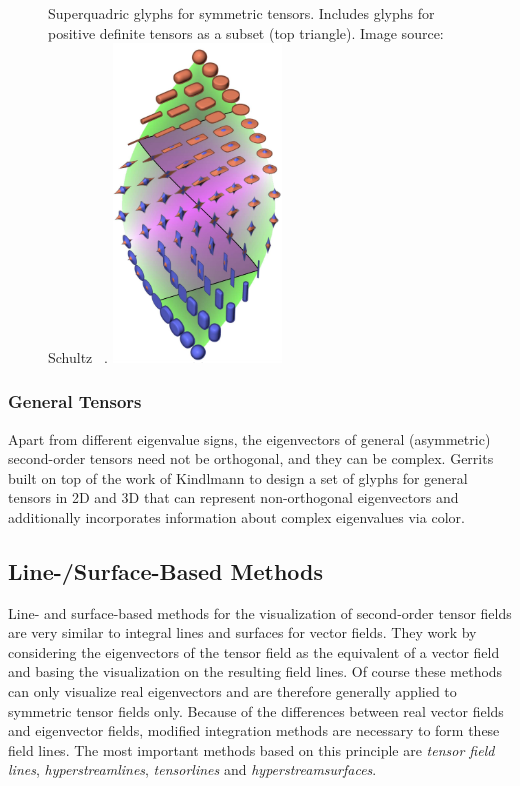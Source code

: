 \begin{figure}
    \begin{captionbeside}
        {Superquadric glyphs for symmetric tensors. Includes glyphs for positive
         definite tensors as a subset (top triangle). Image source: Schultz
         \etal~\cite{Schultz2010a}.\label{fig:tensor_glyphs}}
        \includegraphics[width=0.4\textwidth]{figures/symmetric_tensor_glyphs.png}
    \end{captionbeside}
\end{figure}

\subsubsection{General Tensors} %
%
Apart from different eigenvalue signs, the eigenvectors of general (asymmetric)
second-order tensors need not be orthogonal, and they can be complex.
%
Gerrits \etal~\cite{Gerrits2017} built on top of the work of Kindlmann \etal to
design a set of glyphs for general tensors in \ac{2D} and \ac{3D} that can
represent non-orthogonal eigenvectors and additionally incorporates information
about complex eigenvalues via color.
%

\subsection{Line-/Surface-Based Methods} %
\label{sub:tensor_line_surface_based}
%
Line- and surface-based methods for the visualization of second-order tensor
fields are very similar to integral lines and surfaces for vector fields.
%
They work by considering the eigenvectors of the tensor field as the equivalent
of a vector field and basing the visualization on the resulting field lines.
%
Of course these methods can only visualize real eigenvectors and are therefore
generally applied to symmetric tensor fields only.
%
Because of the differences between real vector fields and eigenvector fields,
modified integration methods are necessary to form these field lines.
%
The most important methods based on this principle are \emph{tensor field
lines}, \emph{hyperstreamlines}, \emph{tensorlines} and
\emph{hyperstreamsurfaces}.
%

